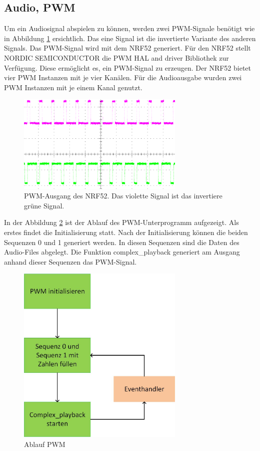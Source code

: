\subsection{Audio, PWM}\label{sec:audioPWM}
Um ein Audiosignal abspielen zu können, werden zwei PWM-Signale benötigt wie in Abbildung \ref{fig:pwm_ausgang} ersichtlich. Das eine Signal ist die invertierte Variante des anderen Signals. 
Das PWM-Signal wird mit dem NRF52 generiert. Für den NRF52 stellt NORDIC SEMICONDUCTOR die PWM HAL and driver Bibliothek zur Verfügung. Diese ermöglicht es, ein PWM-Signal zu erzeugen. Der NRF52 bietet vier PWM Instanzen mit je vier Kanälen. Für die Audioausgabe wurden zwei PWM Instanzen mit je einem Kanal genutzt.

\begin{figure}[H]
	\begin{center}
		\includegraphics[width=80mm]{data/PWM_Signal_500Hz_Mono}
		\caption[PWM-Ausgang des NRF52]{PWM-Ausgang des NRF52. Das violette Signal ist das invertiere grüne Signal.} %
		\label{fig:pwm_ausgang}
	\end{center}
\end{figure}

In der Abbildung \ref{fig:pwm_ablauf} ist der Ablauf des PWM-Unterprogramm aufgezeigt. Als erstes findet die Initialisierung statt. Nach der Initialisierung können die beiden Sequenzen 0 und 1 generiert werden. In diesen Sequenzen sind die Daten des Audio-Files abgelegt. Die Funktion complex\_playback generiert am Ausgang anhand dieser Sequenzen das PWM-Signal.

\begin{figure}[H]
	\begin{center}
		\includegraphics[width=80mm]{data/pwm_ablauf.jpg}
		\caption[Ablauf PWM]{Ablauf PWM} %
		\label{fig:pwm_ablauf}
	\end{center}
\end{figure}

